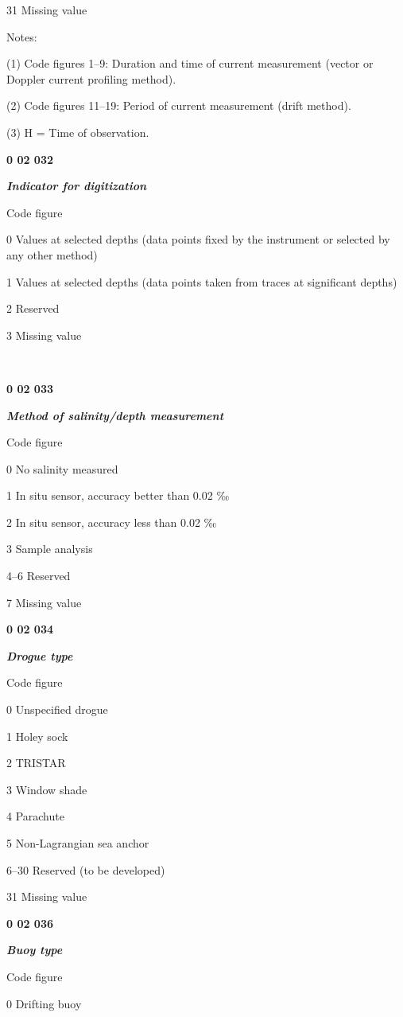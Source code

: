 31 Missing value

Notes:

(1) Code figures 1--9: Duration and time of current measurement (vector or Doppler current profiling method).

(2) Code figures 11--19: Period of current measurement (drift method).

(3) H = Time of observation.

\textbf{0 02 032}

\emph{\textbf{Indicator for digitization}}

Code figure

0 Values at selected depths (data points fixed by the instrument or selected by any other method)

1 Values at selected depths (data points taken from traces at significant depths)

2 Reserved

3 Missing value

\textbf{\\
}

\textbf{0 02 033}

\emph{\textbf{Method of salinity/depth measurement}}

Code figure

0 No salinity measured

1 In situ sensor, accuracy better than 0.02 ‰

2 In situ sensor, accuracy less than 0.02 ‰

3 Sample analysis

4--6 Reserved

7 Missing value

\textbf{0 02 034}

\emph{\textbf{Drogue type}}

Code figure

0 Unspecified drogue

1 Holey sock

2 TRISTAR

3 Window shade

4 Parachute

5 Non-Lagrangian sea anchor

6--30 Reserved (to be developed)

31 Missing value

\textbf{0 02 036}

\emph{\textbf{Buoy type}}

Code figure

0 Drifting buoy

